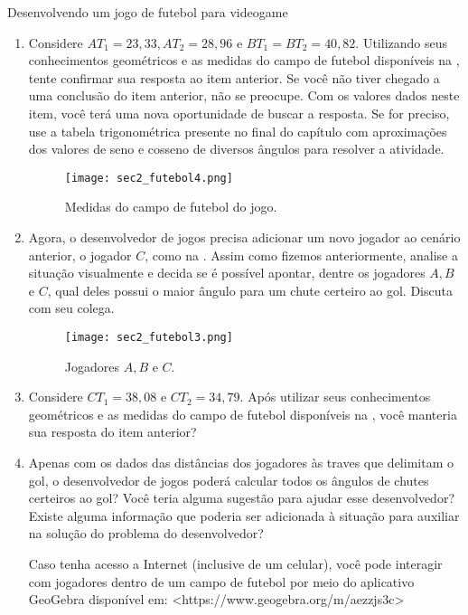 \begin{task}{Desenvolvendo um jogo de futebol para videogame}
\begin{enumerate}
    \item{}
    Considere $AT_1=23,33, AT_2=28,96$ e $BT_1=BT_2=40,82$. Utilizando seus conhecimentos geométricos e as medidas do campo de futebol disponíveis na , tente confirmar sua resposta ao item anterior. Se você não tiver chegado a uma conclusão do item anterior, não se preocupe. Com os valores dados neste item, você terá uma nova oportunidade de buscar a resposta. Se for preciso, use a tabela trigonométrica presente no final do capítulo com aproximações dos valores de seno e cosseno de diversos ângulos para resolver a atividade.
\begin{figure}[H]
    \centering
    \texttt{[image: sec2\_futebol4.png]}
    \caption{Medidas do campo de futebol do jogo.}
    \label{sec2_futebol4_fig}
\end{figure}

    
    \item{}
    Agora, o desenvolvedor de jogos precisa adicionar um novo jogador ao cenário anterior, o jogador $C$, como na . Assim como fizemos anteriormente, analise a situação visualmente e decida se é possível apontar, dentre os jogadores $A, B$ e $C$, qual deles possui o maior ângulo para um chute certeiro ao gol. Discuta com seu colega.
\begin{figure}[H]
    \centering
    \texttt{[image: sec2\_futebol3.png]}
    \caption{Jogadores $A, B$ e $C$.}
    \label{sec2_futebol3_fig}
\end{figure}



    \item{}
    Considere $CT_1=38,08$ e $CT_2=34,79$. Após utilizar seus conhecimentos geométricos e as medidas do campo de futebol disponíveis na , você manteria sua resposta do item anterior?

    \item{}
    Apenas com os dados das distâncias dos jogadores às traves que delimitam o gol, o desenvolvedor de jogos poderá calcular todos os ângulos de chutes certeiros ao gol? Você teria alguma sugestão para ajudar esse desenvolvedor? Existe alguma informação que poderia ser adicionada à situação para auxiliar na solução do problema do desenvolvedor?
    
    Caso tenha acesso a Internet (inclusive de um celular), você pode interagir com jogadores dentro de um campo de futebol por meio do aplicativo GeoGebra disponível em: <https://www.geogebra.org/m/aezzjs3c>
    

\end{enumerate}
\end{task}
